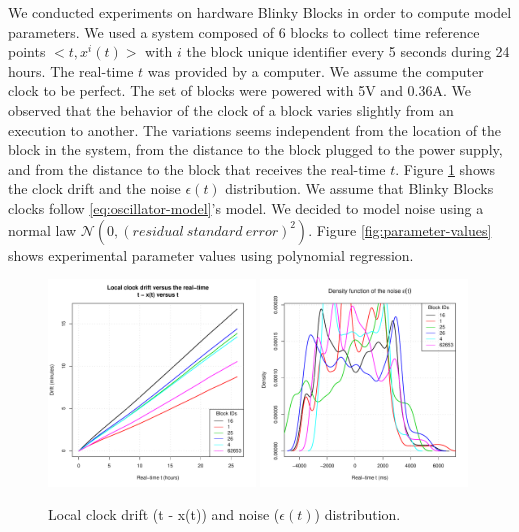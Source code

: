 \documentclass[11pt]{article}
\begin{document}
We conducted experiments on hardware Blinky Blocks in order to compute model parameters. We used a system composed of 6 blocks to collect time reference points $<t,x^i(t)>$ with $i$ the block unique identifier every 5 seconds during 24 hours. The real-time $t$ was provided by a computer. We assume the computer clock to be perfect. The set of blocks were powered with 5V and 0.36A. We observed that the behavior of the clock of a block varies slightly from an execution to another. The variations seems independent from the location of the block in the system, from the distance to the block plugged to the power supply, and from the distance to the block that receives the real-time $t$. Figure \ref{fig:drift-noise} shows the clock drift and the noise $\epsilon(t)$ distribution.  We assume that Blinky Blocks clocks follow \eqref{eq:oscillator-model}'s model. We decided to model noise using a normal law $\mathcal{N}(0,(residual\ standard\ error)^2)$. Figure \ref{fig:parameter-values} shows experimental parameter values using polynomial regression. 

\begin{figure}[h!]
\centering
\includegraphics[width=0.49\textwidth]{pictures/drift.pdf}
\includegraphics[width=0.49\textwidth]{pictures/noise.pdf}
\caption{Local clock drift (t - x(t)) and noise ($\epsilon(t)$) distribution.}
\label{fig:drift-noise}
\end{figure}
\end{document}
